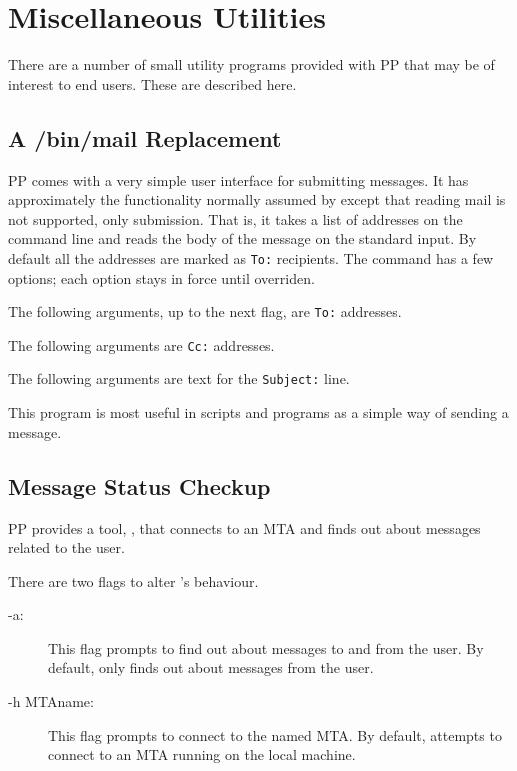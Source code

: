 
\chapter{Miscellaneous Utilities}

There are a number of small utility programs provided with PP that may
be of interest to end users. These are described here.

\section{A /bin/mail Replacement}

PP comes with a very simple user interface for submitting messages. It
has approximately the functionality normally assumed by
{} except that reading mail is not supported, only
submission. That is, it takes a list of addresses on the command line
and reads the body of the message on the standard input. By default
all the addresses are marked as \verb|To:| recipients. The command has
a few options; each option stays in force until overriden.

\begin{describe}
\item[\verb|-t|:] The following arguments, up to the next flag, are
\verb|To:| addresses.
\item[\verb|-c|:] The following arguments are \verb|Cc:| addresses.
\item[\verb|-s|:] The following arguments are text for the
\verb|Subject:| line.
\end{describe}

This program is most useful in scripts and programs as a simple way of
sending a message.

\section{Message Status Checkup}


PP provides a tool, , that connects to an MTA and finds
out about messages related to the user.

There are two flags to alter 's behaviour.
\begin{description}

\item [-a:] This flag prompts  to find out about
messages to and from the user. By default,  only finds
out about messages from the user.

\item [-h MTAname:] This flag prompts  to connect to the
named MTA. By default,  attempts to connect to an MTA
running on the local machine.

\end{description}

